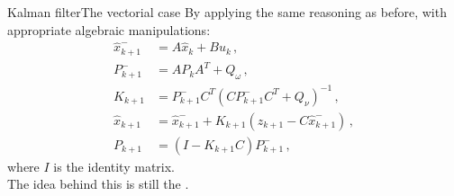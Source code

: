 \begin{frame}{Kalman filter}{The vectorial case}
  By applying the same reasoning as before, with appropriate algebraic manipulations:
  \begin{subequations}
    \begin{align}
      \hat{x}_{k+1}^{-} &= A\hat{x}_k + Bu_k\,,\label{eq:predictionxvec}\\
      P_{k+1}^{-} &= AP_kA^T + Q_{\omega}\,,\label{eq:predictioncovvec}\\
      K_{k+1} &= P_{k+1}^{-}C^T(CP_{k+1}^{-}C^T + Q_{\nu})^{-1}\,,\label{eq:kalmangainvec}\\
      \hat{x}_{k+1} &= \hat{x}_{k+1}^{-} + K_{k+1}(z_{k+1} - C\hat{x}_{k+1}^{-})\,,\label{eq:innovxvec}\\
      P_{k+1} &= (I - K_{k+1}C)P_{k+1}^{-}\,,\label{eq:innovcovvec}
    \end{align}
  \end{subequations}
  where $I$ is the identity matrix.\\
  The idea behind this is still the .
\end{frame}

